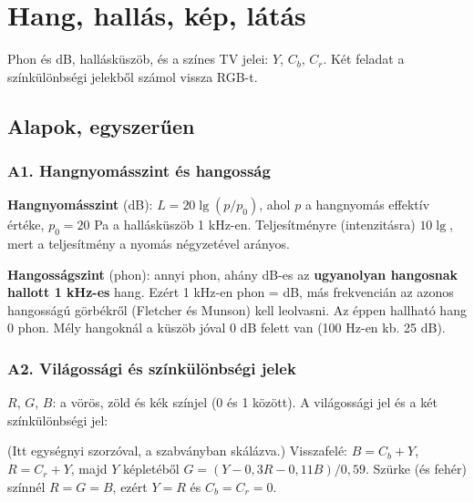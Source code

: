 \setcounter{chapter}{6}
\chapter{\texorpdfstring{Hang, hallás, kép, látás}{Hang, hallás, kép, látás}}\label{f7}
Phon és dB, hallásküszöb, és a színes TV jelei: $Y$, $C_b$, $C_r$. Két feladat a színkülönbségi jelekből számol vissza RGB-t.

\section{Alapok, egyszerűen}
\subsection{\texorpdfstring{A1. Hangnyomásszint és hangosság}{A1. Hangnyomásszint és hangosság}}\label{b7-hang}
\textbf{Hangnyomásszint} (dB): $L=20\lg(p/p_0)$, ahol $p$ a hangnyomás effektív értéke, $p_0=20$ \textmu{}Pa a hallásküszöb 1 kHz-en. Teljesítményre (intenzitásra) $10\lg$, mert a teljesítmény a nyomás négyzetével arányos.

\textbf{Hangosságszint} (phon): annyi phon, ahány dB-es az \textbf{ugyanolyan hangosnak hallott 1 kHz-es} hang. Ezért 1 kHz-en phon = dB, más frekvencián az azonos hangosságú görbékről (Fletcher és Munson) kell leolvasni. Az éppen hallható hang 0 phon. Mély hangoknál a küszöb jóval 0 dB felett van (100 Hz-en kb. 25 dB).

\subsection{\texorpdfstring{A2. Világossági és színkülönbségi jelek}{A2. Világossági és színkülönbségi jelek}}\label{b7-szin}
$R$, $G$, $B$: a vörös, zöld és kék színjel (0 és 1 között). A világossági jel és a két színkülönbségi jel:

\begin{center}\end{center}

(Itt egységnyi szorzóval, a szabványban skálázva.) Visszafelé: $B=C_b+Y$, $R=C_r+Y$, majd $Y$ képletéből $G=(Y-0{,}3R-0{,}11B)/0{,}59$. Szürke (és fehér) színnél $R=G=B$, ezért $Y=R$ és $C_b=C_r=0$.

